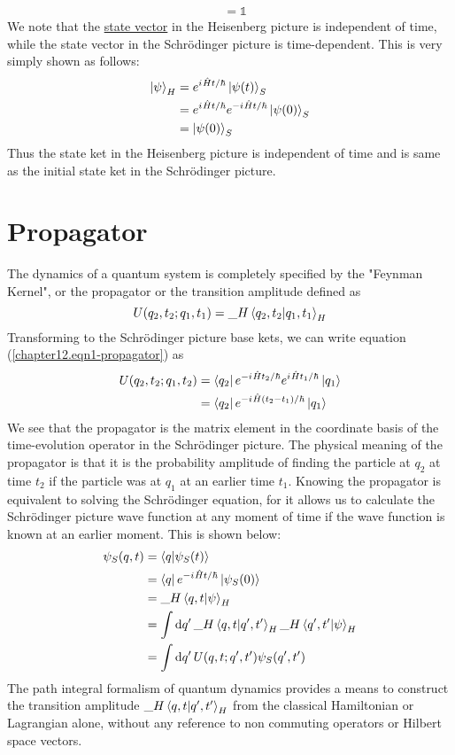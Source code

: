 \begin{enumerate}
\begin{align}
		&= \mathbb{1}
	\end{align}
	We note that the \underline{state vector} in the Heisenberg picture is independent of time, while the state vector in the Schr\"{o}dinger picture is time-dependent. This is very simply shown as follows:
	\begin{align}
		\ket{\psi}_H &= e^{{i\mkern1mu} \hat{H}t/\hbar} \ket{\psi(t)}_S \\
		&= e^{{i\mkern1mu} \hat{H}t/\hbar} e^{-{i\mkern1mu} \hat{H}t/\hbar} \ket{\psi(0)}_S\\
		&= \ket{\psi(0)}_S
	\end{align}
	Thus the state ket in the Heisenberg picture is independent of time and is same as the initial state ket in the Schr\"{o}dinger picture.
	
	
	\section{Propagator}
	The dynamics of a quantum system is completely specified by the "Feynman Kernel", or the propagator or the transition amplitude defined as
	\begin{equation}
		U(q_2, t_2; q_1, t_1) = {\_H}\braket{q_2, t_2}{q_1, t_1}_H
		\label{chapter12.eqn1-propagator}
	\end{equation}
	Transforming to the Schr\"{o}dinger picture base kets, we can write equation (\ref{chapter12.eqn1-propagator}) as
	\begin{align}
		U(q_2, t_2; q_1, t_2) 
		&= \bra{q_2}e^{-{i\mkern1mu} \hat{H}t_2/\hbar} e^{{i\mkern1mu} \hat{H}t_1/\hbar} \ket{q_1} \nonumber \\
		&= \bra{q_2}e^{-{i\mkern1mu} \hat{H}(t_2-t_1)/\hbar} \ket{q_1} \label{chapter12.eqn2-propagator}
	\end{align}
	We see that the propagator is the matrix element in the coordinate basis of the time-evolution operator in the Schr\"{o}dinger picture. The physical meaning of the propagator is that it is the probability amplitude of finding the particle at $q_2$ at time $t_2$ if the particle was at $q_1$ at an earlier time $t_1$. Knowing the propagator is equivalent to solving the Schr\"{o}dinger equation, for it allows us to calculate the Schr\"{o}dinger picture wave function at any moment of time if the wave function is known at an earlier moment. This is shown below:
	\begin{align}
		\psi_S(q,t )
		&= \braket{q}{\psi_S(t)} \\
		&= \bra{q}e^{-{i\mkern1mu} \hat{H}t/\hbar} \ket{\psi_S(0)} \\
		&= {\_H}\braket{q,t}{\psi}_H \\
		&= \int \dd{q^\prime} {\_H}\braket{q,t}{q^\prime, t^\prime}_H {\_H}\braket{q^\prime, t^\prime}{\psi}_H \\
		&= \int \dd{q^\prime} U(q,t;q^\prime, t^\prime) \psi_S(q^\prime,t^\prime)
	\end{align}
	The path integral formalism of quantum dynamics provides a means to construct the transition amplitude ${\_H}\braket{q,t}{q^\prime, t^\prime}_H$ from the classical Hamiltonian or Lagrangian alone, without any reference to non commuting operators or Hilbert space vectors.\\
	

\end{enumerate}
